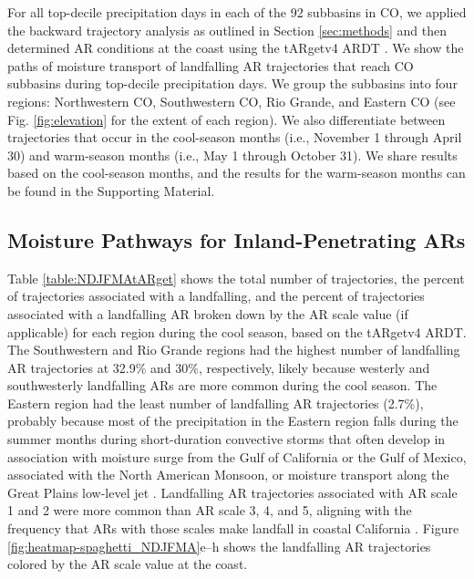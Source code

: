 \documentclass[draft]{agujournal2019}
\begin{document}
For all top-decile precipitation days in each of the 92 subbasins in CO, we applied the backward trajectory analysis as outlined in Section \ref{sec:methods} and then determined AR conditions at the coast using the tARgetv4 ARDT \cite{Guan2024AERA5}. We show the paths of moisture transport of landfalling AR trajectories that reach CO subbasins during top-decile precipitation days. We group the subbasins into four regions: Northwestern CO, Southwestern CO, Rio Grande, and Eastern CO (see Fig. \ref{fig:elevation} for the extent of each region). We also differentiate between trajectories that occur in the cool-season months (i.e., November 1 through April 30) and warm-season months (i.e., May 1 through October 31). We share results based on the cool-season months, and the results for the warm-season months can be found in the Supporting Material. 

\subsection{Moisture Pathways for Inland-Penetrating ARs}
\label{sec:results:moisture_pathways}

Table \ref{table:NDJFMAtARget} shows the total number of trajectories, the percent of trajectories associated with a landfalling, and the percent of trajectories associated with a landfalling AR broken down by the AR scale value (if applicable) for each region during the cool season, based on the tARgetv4 ARDT. The Southwestern and Rio Grande regions had the highest number of landfalling AR trajectories at 32.9\% and 30\%, respectively, likely because westerly and southwesterly landfalling ARs are more common during the cool season. The Eastern region had the least number of landfalling AR trajectories (2.7\%), probably because most of the precipitation in the Eastern region falls during the summer months during short-duration convective storms that often develop in association with moisture surge from the Gulf of California or the Gulf of Mexico, associated with the North American Monsoon, or moisture transport along the Great Plains low-level jet \cite{Helfand1995ClimatologyStates, Higgins2004RelationshipsStates, Pu2016DynamicalPrecipitation,  Schubert1998SubseasonalStates, Weaver2008VariabilityImpacts}. Landfalling AR trajectories associated with AR scale 1 and 2 were more common than AR scale 3, 4, and 5, aligning with the frequency that ARs with those scales make landfall in coastal California \cite[Fig. 7]{MartinRalph2019}. Figure \ref{fig:heatmap-spaghetti_NDJFMA}e--h shows the landfalling AR trajectories colored by the AR scale value at the coast.
\end{document}
